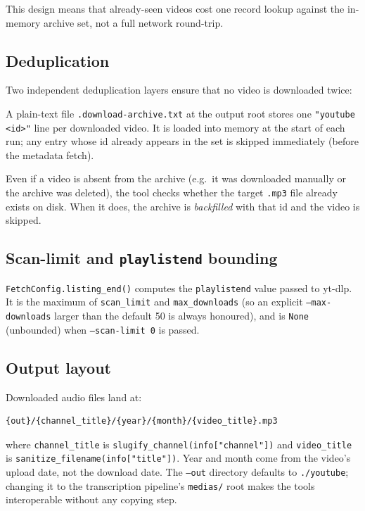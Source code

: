 \documentclass[11pt,a4paper]{report}
\newcommand{\code}[1]{\texttt{\small #1}}
\begin{document}
This design means that already-seen videos cost one record lookup against the
in-memory archive set, not a full network round-trip.

\subsection{Deduplication}

Two independent deduplication layers ensure that no video is downloaded twice:

\begin{description}[leftmargin=2em,style=nextline]
  \item[Download archive] A plain-text file \code{.download-archive.txt} at the
        output root stores one \code{"youtube <id>"} line per downloaded video.
        It is loaded into memory at the start of each run; any entry whose id
        already appears in the set is skipped immediately (before the metadata
        fetch).
  \item[Filesystem check] Even if a video is absent from the archive (e.g.\ it
        was downloaded manually or the archive was deleted), the tool checks
        whether the target \code{.mp3} file already exists on disk.  When it does,
        the archive is \emph{backfilled} with that id and the video is skipped.
\end{description}

\subsection{Scan-limit and \texttt{playlistend} bounding}

\code{FetchConfig.listing\_end()} computes the \code{playlistend} value passed to
yt-dlp.  It is the maximum of \code{scan\_limit} and \code{max\_downloads}
(so an explicit \code{--max-downloads} larger than the default 50 is always
honoured), and is \code{None} (unbounded) when \code{--scan-limit 0} is passed.

\subsection{Output layout}

Downloaded audio files land at:
\begin{lstlisting}[style=sh, numbers=none]
{out}/{channel_title}/{year}/{month}/{video_title}.mp3
\end{lstlisting}
where \code{channel\_title} is \code{slugify\_channel(info["channel"])} and
\code{video\_title} is \code{sanitize\_filename(info["title"])}.  Year and month
come from the video's upload date, not the download date.  The \code{--out}
directory defaults to \code{./youtube}; changing it to the transcription pipeline's
\code{medias/} root makes the tools interoperable without any copying step.
\end{document}
